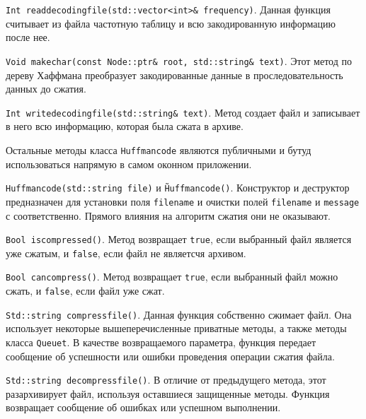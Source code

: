 \texttt{Int read{\textunderscore}decoding{\textunderscore}file(std::vector<int>\& frequency)}.
Данная функция считывает из файла частотную таблицу и всю закодированную информацию после нее.



\texttt{Void make{\textunderscore}char(const Node::ptr\& root, std::string\& text)}.
Этот метод по дереву Хаффмана преобразует закодированные данные в проследовательность данных до сжатия.



\texttt{Int write{\textunderscore}decoding{\textunderscore}file(std::string\& text)}.
Метод создает файл и записывает в него всю информацию, которая была сжата в архиве.



Остальные методы класса \texttt{Huffman{\textunderscore}code} являются публичными и бутуд использоваться напрямую в самом оконном приложении.



\texttt{Huffman{\textunderscore}code(std::string file)} и \texttt{\~Huffman{\textunderscore}code()}. 
Конструктор и деструктор предназначен для установки поля \texttt{filename} и очистки полей \texttt{filename} и \texttt{message} с соответственно.
Прямого влияния на алгоритм сжатия они не оказывают.



\texttt{Bool is{\textunderscore}compressed()}. 
Метод возвращает \texttt{true}, если выбранный файл является уже сжатым, и \texttt{false}, если файл не являетсчя архивом.



\texttt{Bool can{\textunderscore}compress()}.
Метод возвращает \texttt{true}, если выбранный файл можно сжать, и \texttt{false}, если файл уже сжат.



\texttt{Std::string compress{\textunderscore}file()}.
Данная функция собственно сжимает файл. 
Она использует некоторые вышеперечисленные приватные методы, а также методы класса \texttt{Queue{\textunderscore}t}.
В качестве возвращаемого параметра, функция передает сообщение об успешности или ошибки проведения операции сжатия файла.



\texttt{Std::string decompress{\textunderscore}file()}.
В отличие от предыдущего метода, этот разархивирует файл, используя оставшиеся защищенные методы.
Функция возвращает сообщение об ошибках или успешном выполнении.